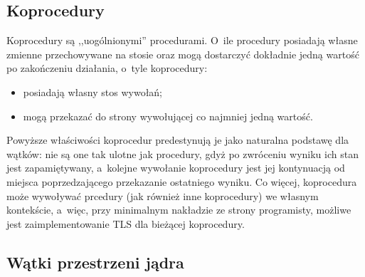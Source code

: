 \subsection{Koprocedury}
%
\indent
	Koprocedury są ,,uogólnionymi'' procedurami. O~ile procedury posiadają własne zmienne
	przechowywane na stosie oraz mogą dostarczyć dokładnie jedną wartość po zakończeniu
	działania, o~tyle koprocedury:
	\begin{itemize}
	\item posiadają własny stos wywołań;
	\item mogą przekazać do strony wywołującej co najmniej jedną wartość.
	\end{itemize}
	Powyższe właściwości koprocedur predestynują je jako naturalna podstawę dla wątków:
	nie są one tak ulotne jak procedury, gdyż po zwróceniu wyniku ich stan jest zapamiętywany,
	a~kolejne wywołanie koprocedury jest jej kontynuacją od miejsca poprzedzającego przekazanie
	ostatniego wyniku. Co więcej, koprocedura może wywoływać prcedury (jak również inne koprocedury)
	we własnym kontekście, a~więc, przy minimalnym nakładzie ze strony programisty, możliwe jest
	zaimplementowanie TLS dla bieżącej koprocedury.
\par

\subsection{Wątki przestrzeni jądra}

